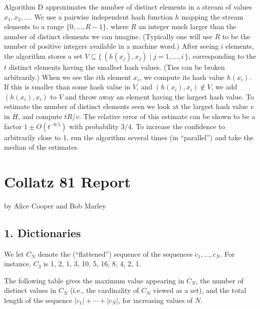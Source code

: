 \documentclass{tufte-handout}
\begin{document}
Algorithm D approximates the number of distinct elements in a stream
of values $x_1,x_2,\ldots$.
We use a pairwise independent hash function $h$ mapping the stream
elements to a range $\{0,\ldots, R-1\}$, where $R$ an integer much
larger than the number of distinct elements we can imagine.
(Typically one will use $R$ to be the number of positive integers
available in a machine word.)
After seeing $i$ elements, the algorithm stores a set $V\subseteq \{
\,(h(x_j),x_j) \mid j=1,\dots,i\,\}$, corresponding to the $t$ distinct
elements having the smallest hash values.
(Ties can be broken arbitrarily.)
When we see the $i$th element $x_i$, we compute its hash value
$h(x_i)$.
If this is smaller than some hash value in $V$, and
$(h(x_i),x_i)\not\in V$, we add $(h(x_i),x_i)$ to $V$ and throw away
an element having the largest hash value.
To estimate the number of distinct elements seen we look at the
largest hash value $v$ in $H$, and compute $tR/v$.
The relative error of this estimate can be shown to be a factor $1\pm
O(t^{-0.5})$ with probability $3/4$.
To increase the confidence to arbitrarily close to 1, run the
algorithm several times (in ``parallel'') and take the median of the
estimates.





\newpage
\section{Collatz 81 Report}


by Alice Cooper and Bob Marley


\subsection{1. Dictionaries}

We let $C_N$ denote the (``flattened'') sequence of the sequences
$c_1,\ldots, c_N$. For instance, $C_3$ is 1, 2, 1, 3, 10, 5, 16, 8, 4,
2, 1.


The following table gives the maximum value appearing in $C_N$, the number
of distinct values in $C_N$ (i.e., the cardinality of $C_N$ viewed as
a set), and the total length of the sequence $|c_1|+\cdots+|c_N|$,
for increasing values of $N$.
\end{document}
